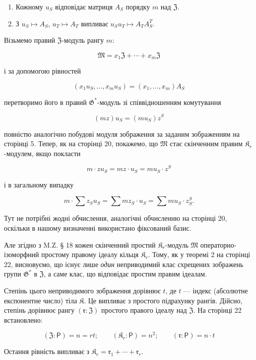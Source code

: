 \documentclass[11pt]{article}
\begin{document}
\begin{enumerate}
\item Кожному \(u_S\) відповідає матриця \(A_S\) порядку \(m\) над \(\mathfrak Z\).
\item З \(u_S \mapsto A_S\), \(u_T \mapsto A_T\) випливає \(u_Su_T \mapsto A_TA_S^T\).
\end{enumerate}

Візьмемо правий \(\mathfrak Z\)-модуль рангу \(m\):

\[\mathfrak{M}=x_1\mathfrak{Z}+\cdots+x_m\mathfrak{Z}\]

і за допомогою рівностей

\[(x_1u_S,\ldots,x_mu_S)=(x_1,\ldots,x_m)A_S\]

перетворимо його в правий \(\mathfrak G^*\)-модуль зі співвідношенням комутування

\[(mz) u_S = (mu_S) z^S\]

повністю аналогічно побудові модуля зображення за заданим зображенням на сторінці 5. Тепер, як на сторінці 20, покажемо, що \(\mathfrak{M}\) стає скінченним правим \(\mathfrak K_r\)-модулем, якщо покласти

\[m \cdot z u_S = mz \cdot u_S = mu_S \cdot z^S\]

і в загальному випадку

\[m \cdot \sum z_S u_S = \sum m z_S \cdot u_S = \sum m u_S \cdot z_S^S.\]

Тут не потрібні жодні обчислення, аналогічні обчисленню на сторінці 20, оскільки в нашому визначенні використано фіксований базис.

Але згідно з M.Z. § 18 кожен скінченний простий \(\mathfrak K_r\)-модуль \(\mathfrak{M}\) операторно-ізоморфний простому правому ідеалу кільця \(\mathfrak K_r\). Тому, як у теоремі 2 на сторінці 22, висновуємо, що існує лише \emph{один} неприводимий клас схрещених зображень групи \(\mathfrak{G}^*\) в \(\mathfrak Z\), а саме клас, що відповідає простим правим ідеалам.

Степінь цього неприводимого зображення дорівнює \(t\), де \(t\) --- індекс (абсолютне експонентне число) тіла \(\mathfrak K\). Це випливає з простого підрахунку рангів. Дійсно, степінь дорівнює рангу \((\mathfrak r:\mathfrak Z)\) простого правого ідеалу над \(\mathfrak Z\). На сторінці 22 встановлено:

\[
(\mathfrak Z:\mathsf{P})=n=rt;\qquad (\mathfrak K_r:\mathsf{P})=n^2;\qquad (\mathfrak r:\mathsf{P})=n\cdot t
\]

Остання рівність випливає з \(\mathfrak K_r = \mathfrak{r}_1 + \cdots + \mathfrak{r}_r\).
\end{document}
